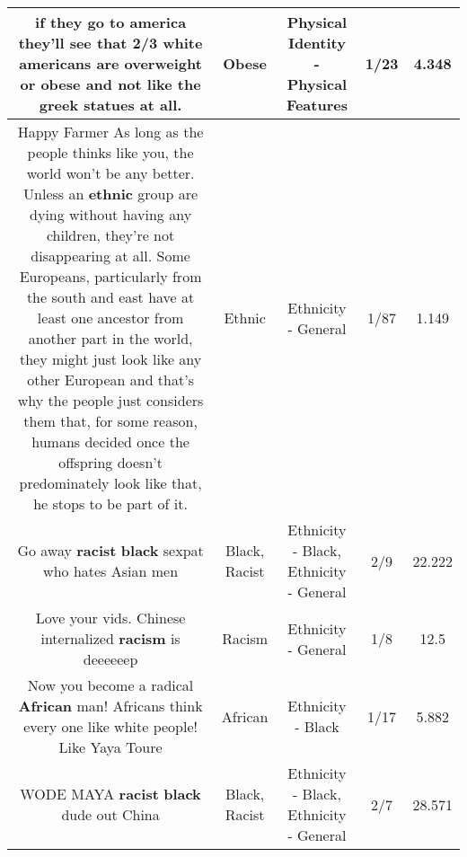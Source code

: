 \documentclass[11pt]{article}
\newlength\mylength
\begin{document}
\begin{center}
\begin{longtable}{|C{.65\mylength}|C{.30\mylength}|C{.12\mylength}|C{.12\mylength}|C{.12\mylength}|}
  \small if they go to america they'll see that 2/3 white americans are overweight or \textbf{obese} and not like the greek statues at all.\normalsize   & Obese & Physical Identity - Physical Features & 1/23 & 4.348 \\  \hline
  \small Happy Farmer
 As long as the people thinks like you, the world won't be any better. Unless an \textbf{ethnic} group are dying without having any children, they're not disappearing at all. Some Europeans, particularly from the south and east have at least one ancestor from another part in the world, they might just look like any other European and that's why the people just considers them that, for some reason, humans decided once the offspring doesn't predominately look like that, he stops to be part of it.\normalsize   & Ethnic & Ethnicity - General & 1/87 & 1.149 \\  \hline
  \small Go away \textbf{racist} \textbf{black} sexpat who hates Asian men\normalsize   & Black, Racist & Ethnicity - Black, Ethnicity - General & 2/9 & 22.222 \\  \hline
  \small Love your vids. Chinese internalized \textbf{racism} is deeeeeep\normalsize   & Racism & Ethnicity - General & 1/8 & 12.5 \\  \hline
  \small Now you become a radical \textbf{African} man! Africans think every one like white people! Like Yaya Toure\normalsize   & African & Ethnicity - Black & 1/17 & 5.882 \\  \hline
  \small WODE MAYA \textbf{racist} \textbf{black} dude out China\normalsize   & Black, Racist & Ethnicity - Black, Ethnicity - General & 2/7 & 28.571 \\  \hline

\end{longtable}
\end{center}
\end{document}
